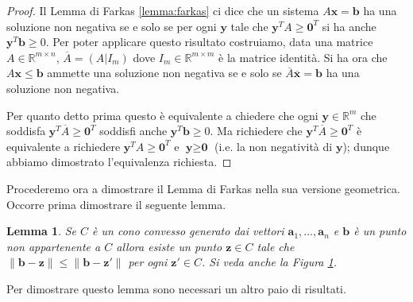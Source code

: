 \documentclass[italian, letter paper, 12pt, reqno]{article}
\theoremstyle{myteo}
\newtheorem{lemma}[theorem]{Lemma}
\numberwithin{equation}{section}
\begin{document}
\begin{proof}
  Il Lemma di Farkas \ref{lemma:farkas} ci dice che un sistema \(A \textbf{x}= \textbf{b}\) ha una soluzione non negativa se e solo se per ogni \(\textbf{y}\) tale che \(\textbf{y}^TA \geq \textbf{0}^T\) si ha anche \(\textbf{y}^T \textbf{b} \geq 0\).
  Per poter applicare questo risultato costruiamo, data una matrice \(A\in \mathbb{R}^{m\times n}\), \(\overline{A}= (A|I_m)\) dove \(I_m\in \mathbb{R}^{m\times m}\) è la matrice identità.
  Si ha ora che \(A \textbf{x} \leq \textbf{b}\) ammette una soluzione non negativa se e solo se \(\overline{A} \mathbf{\overline{x}} = \textbf{b}\) ha una soluzione non negativa.

  Per quanto detto prima questo è equivalente a chiedere che ogni \(\textbf{y}\in \mathbb{R}^m\) che soddisfa \(\mathbf{y}^T\overline{A} \geq \textbf{0}^T\) soddisfi anche \(\mathbf{y}^T \textbf{b} \geq 0\).
  Ma richiedere che \(\textbf{y}^T\overline{A} \geq \textbf{0}^T\) è equivalente a richiedere \(\textbf{y}^TA \geq \textbf{0}^T\) e \(\textbf{y} \geq \textbf{0}\) (i.e. la non negatività di \(\textbf{y}\)); dunque abbiamo dimostrato l'equivalenza richiesta.
\end{proof}

Procederemo ora a dimostrare il Lemma di Farkas nella sua versione geometrica.
Occorre prima dimostrare il seguente lemma.

\begin{lemma}
  \label{lemma:punto_vicino}
  Se \(C\) è un cono convesso generato dai vettori \(\mathbf{a}_1,\ldots,\mathbf{a}_n\) e \(\mathbf{b}\) è un punto non appartenente a \(C\) allora esiste un punto \(\mathbf{z}\in C\) tale che \(\|\mathbf{b} - \mathbf{z}\| \le \|\mathbf{b} - \mathbf{z}'\|\) per ogni \(\mathbf{z}'\in C\).
  Si veda anche la Figura \ref{fig:punto_vicino}.
\end{lemma}

Per dimostrare questo lemma sono necessari un altro paio di risultati.

\begin{figure}
  \begin{center}
    \hspace{1cm}
  \end{center}
  \caption{}
  \label{fig:punto_vicino}
\end{figure}
\end{document}
